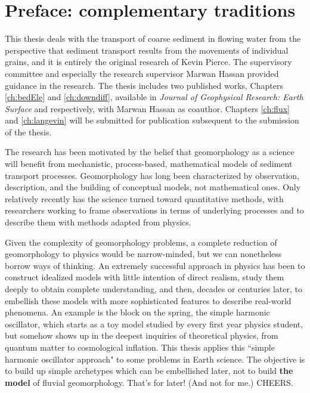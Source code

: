 
\chapter{Preface: complementary traditions}

This thesis deals with the transport of coarse sediment in flowing water from the perspective that sediment transport results from the movements of individual grains, and it is entirely the original research of Kevin Pierce.
The supervisory committee and especially the research supervisor Marwan Hassan provided guidance in the research.
The thesis includes two published works, Chapters \ref{ch:bedEle} and \ref{ch:downdiff}, available in \textit{Journal of Geophysical Research: Earth Surface} and \citet{Geophysical Research Letters} respectively, with Marwan Hassan as coauthor. Chapters \ref{ch:flux} and \ref{ch:langevin} will be submitted for publication subsequent to the submission of the thesis.

The research has been motivated by the belief that geomorphology as a science will benefit from mechanistic, process-based, mathematical models of sediment transport processes.
Geomorphology has long been characterized by observation, description, and the building of conceptual models, not mathematical ones.
Only relatively recently has the science turned toward quantitative methods, with researchers working to frame observations in terms of underlying processes and to describe them with methods adapted from physics.

Given the complexity of geomorphology problems, a complete reduction of geomorphology to physics would be narrow-minded, but we can nonetheless borrow ways of thinking.
An extremely successful approach in physics has been to construct idealized models with little intention of direct realism, study them deeply to obtain complete understanding, and then, decades or centuries later, to embellish these models with more sophisticated features to describe real-world phenomena.
An example is the block on the spring, the simple harmonic oscillator, which starts as a toy model studied by every first year physics student, but somehow shows up in the deepest inquiries of theoretical physics, from quantum matter to cosmological inflation.
This thesis applies this ``simple harmonic oscillator approach" to some problems in Earth science.
The objective is to build up simple archetypes which can be embellished later, not to build \textbf{the model} of fluvial geomorphology. 
That's for later! (And not for me.) CHEERS.
